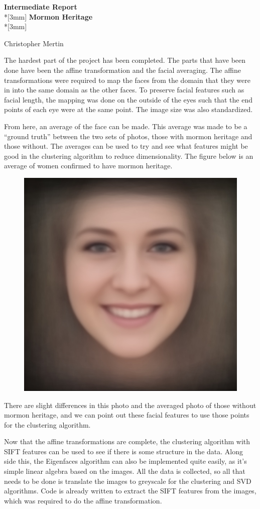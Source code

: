 \documentclass{article}
\begin{document}
\pagestyle{empty}
\begin{center}
{\Large{\bf Intermediate Report}}\\*[3mm]
{\bf Mormon Heritage} \\*[3mm]

Christopher Mertin
\end{center}

The hardest part of the project has been completed. The parts that have been done have been the affine transformation and the facial averaging. The affine transformations were required to map the faces from the domain that they were in into the same domain as the other faces. To preserve facial features such as facial length, the mapping was done on the outside of the eyes such that the end points of each eye were at the same point. The image size was also standardized.

From here, an average of the face can be made. This average was made to be a ``ground truth'' between the two sets of photos, those with mormon heritage and those without. The averages can be used to try and see what features might be good in the clustering algorithm to reduce dimensionality. The figure below is an average of women confirmed to have mormon heritage.

\begin{figure}[!h]
\centering
\includegraphics[width=.5\linewidth]{data/Provo_avg.jpg}
\end{figure}

There are slight differences in this photo and the averaged photo of those without mormon heritage, and we can point out these facial features to use those points for the clustering algorithm.

Now that the affine transformations are complete, the clustering algorithm with SIFT features can be used to see if there is some structure in the data. Along side this, the Eigenfaces algorithm can also be implemented quite easily, as it's simple linear algebra based on the images. All the data is collected, so all that needs to be done is translate the images to greyscale for the clustering and SVD algorithms. Code is already written to extract the SIFT features from the images, which was required to do the affine transformation. 
\end{document}
